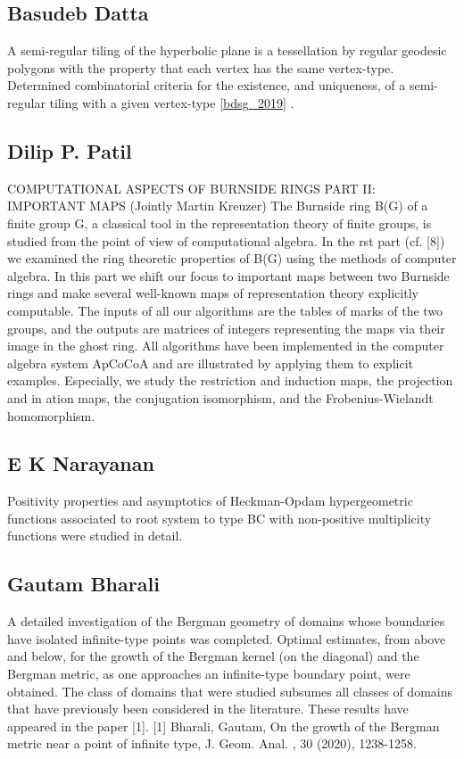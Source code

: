 \subsection{Basudeb Datta}

A semi-regular tiling of the hyperbolic plane is a tessellation by regular geodesic polygons with the property that each vertex has the same vertex-type. Determined combinatorial criteria for the existence, and uniqueness, of a semi-regular tiling with a given vertex-type \ref{bdsg_2019} . 


\subsection{Dilip P. Patil}

COMPUTATIONAL ASPECTS OF BURNSIDE RINGS PART II: IMPORTANT MAPS (Jointly Martin  Kreuzer)   The Burnside ring B(G) of a finite group G, a classical tool in the representation theory of finite groups, is studied from the point of view of computational algebra. In the rst part (cf. [8]) we examined the ring theoretic properties of B(G) using the methods of computer algebra. In this part we shift our focus to important maps between two Burnside rings and make several well-known maps of representation theory explicitly computable. The inputs of all our algorithms are the tables of marks of the two groups, and the outputs are matrices of integers representing the maps via their image in the ghost ring. All algorithms have been implemented in the computer algebra system ApCoCoA and are illustrated by applying them to explicit examples. Especially, we study the restriction and induction maps, the projection and in ation maps, the conjugation isomorphism, and the Frobenius-Wielandt homomorphism.


\subsection{E K Narayanan}

Positivity properties and asymptotics of Heckman-Opdam hypergeometric functions associated to root system to type BC with non-positive multiplicity functions were studied in detail.


\subsection{Gautam Bharali}

A detailed investigation of the Bergman geometry of domains whose boundaries have isolated infinite-type points was completed. Optimal estimates, from above and below, for the growth of the Bergman kernel (on the diagonal) and the Bergman metric, as one approaches an infinite-type boundary point, were obtained. The class of domains that were studied subsumes all classes of domains that have previously been considered in the literature. These results have appeared in the paper [1].  [1] Bharali, Gautam, On the growth of the Bergman metric near a point of infinite type, J. Geom. Anal. , 30 (2020), 1238-1258.


